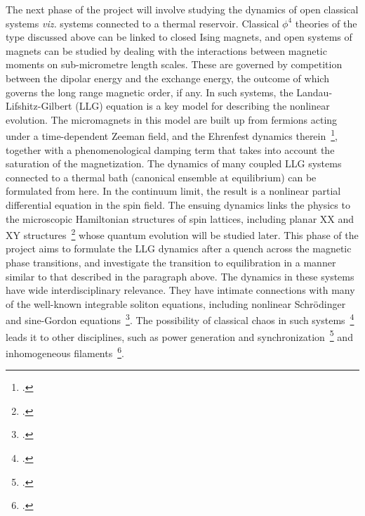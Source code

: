 \documentclass[a4paper,11pt]{article}
\begin{document}
The next phase of the project will involve studying the dynamics of open classical systems \textit{viz.} systems connected to a thermal reservoir. Classical $\phi^4$ theories of the type discussed above can be linked to closed Ising magnets, and open systems of magnets can be studied by dealing with the interactions between magnetic moments on sub-micrometre length scales. These are governed by competition between the dipolar energy and the exchange energy, the outcome of which governs the long range magnetic order, if any. In such systems, the Landau-Lifshitz-Gilbert (LLG) equation is a key model for describing the nonlinear evolution. The micromagnets in this model are built up from fermions acting under a time-dependent Zeeman field, and the Ehrenfest dynamics therein~\footcite{gll:review}, together with a phenomenological damping term that takes into account the saturation of the magnetization. The dynamics of many coupled LLG systems connected to a thermal bath (canonical ensemble at equilibrium) can be 
formulated from here. In the continuum limit, the result is a nonlinear partial differential equation in the spin field. The ensuing dynamics links the physics to the microscopic Hamiltonian structures of spin lattices, including planar XX and XY structures~\footcites{laxmanan:xxxy1}{laxmanan:xxxy2} whose quantum evolution will be studied later. This phase of the project aims to formulate the LLG dynamics after a quench across the magnetic phase transitions, and investigate the transition to equilibration in a manner similar to that described in the paragraph above. The dynamics in these systems have wide interdisciplinary relevance. They have intimate connections with many of the well-known integrable soliton equations, including nonlinear Schr\"odinger and sine-Gordon equations~\footcites{laxmanan:xxxy1}{laxmanan:xxxy2}{sinegordon1}{sinegordon2}. The possibility of classical chaos in such systems~\footcite{gll:review} leads it to other disciplines, such as power generation and synchronization~\footcite{
lax13} and inhomogeneous filaments~\footcite{lax14}. 
\end{document}
